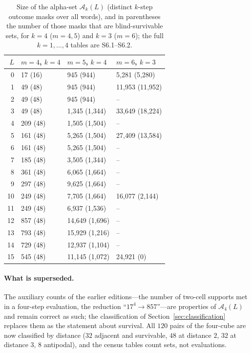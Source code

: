 \documentclass[11pt,a4paper]{article}
\theoremstyle{plain}
\theoremstyle{definition}
\theoremstyle{remark}
\newcommand{\calA}{\mathcal{A}}
\begin{document}
\begin{table}[t]
\centering\small
\caption{Size of the alpha-set $\calA_k(L)$ (distinct $k$-step outcome masks over all words), and in parentheses the number of those masks that are blind-survivable sets, for $k=4$ ($m=4,5$) and $k=3$ ($m=6$); the full $k=1,\dots,4$ tables are S6.1--S6.2.}
\label{tab:alpha}
\begin{tabular}{rlll}
\toprule
$L$ & $m=4$, $k=4$ & $m=5$, $k=4$ & $m=6$, $k=3$\\
\midrule
0 & 17 (16) & 945 (944) & 5{,}281 (5{,}280)\\
1 & 49 (48) & 945 (944) & 11{,}953 (11{,}952)\\
2 & 49 (48) & 945 (944) & --\\
3 & 49 (48) & 1{,}345 (1{,}344) & 33{,}649 (18{,}224)\\
4 & 209 (48) & 1{,}505 (1{,}504) & --\\
5 & 161 (48) & 5{,}265 (1{,}504) & 27{,}409 (13{,}584)\\
6 & 161 (48) & 5{,}265 (1{,}504) & --\\
7 & 185 (48) & 3{,}505 (1{,}344) & --\\
8 & 361 (48) & 6{,}065 (1{,}664) & --\\
9 & 297 (48) & 9{,}625 (1{,}664) & --\\
10 & 249 (48) & 7{,}705 (1{,}664) & 16{,}077 (2{,}144)\\
11 & 249 (48) & 6{,}937 (1{,}536) & --\\
12 & 857 (48) & 14{,}649 (1{,}696) & --\\
13 & 793 (48) & 15{,}929 (1{,}216) & --\\
14 & 729 (48) & 12{,}937 (1{,}104) & --\\
15 & 545 (48) & 11{,}145 (1{,}072) & 24{,}921 (0)\\
\bottomrule
\end{tabular}
\end{table}

\paragraph{What is superseded.} The auxiliary counts of the earlier editions---the number of two-cell supports met in a four-step evaluation, the reduction ``$17^4\to857$''---are properties of $\calA_4(L)$ and remain correct as such; the classification of Section~\ref{sec:classification} replaces them as the statement about survival. All $120$ pairs of the four-cube are now classified by distance ($32$ adjacent and survivable, $48$ at distance $2$, $32$ at distance $3$, $8$ antipodal), and the census tables count sets, not evaluations.
\end{document}
